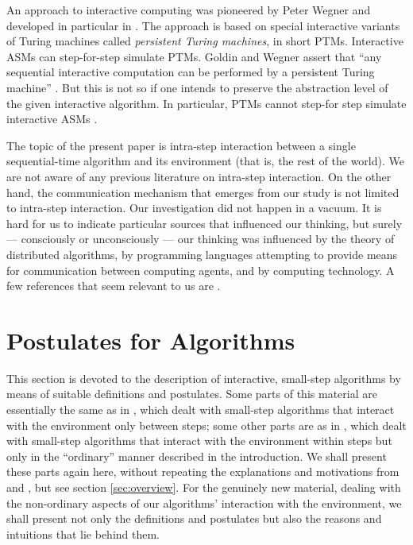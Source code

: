 \documentclass{LMCS}
\theoremstyle{definition}
\begin{document}
An approach to interactive computing was pioneered by Peter Wegner and
developed in particular in \cite{GSAS}.  The approach is based on
special interactive variants of Turing machines called \emph{persistent
Turing machines}, in short PTMs.  Interactive ASMs can step-for-step
simulate PTMs.  Goldin and Wegner assert that ``any sequential interactive
computation can be performed by a persistent Turing machine'' \cite{gsw}.
But this is not so if one intends to preserve the abstraction level of the
given interactive algorithm.  In particular, PTMs cannot step-for step
simulate interactive ASMs \cite{ia05}.

The topic of the present paper is intra-step interaction between a
single sequential-time algorithm and its environment (that is,
the rest of the world).  We are not aware of any previous literature
on intra-step interaction.  On the other hand, the communication
mechanism that emerges from our study is not limited to intra-step
interaction.  Our investigation did not happen in a vacuum.  It is
hard for us to indicate particular sources that influenced our
thinking, but surely --- consciously or unconsciously --- our thinking
was influenced by the theory of distributed algorithms, by programming
languages attempting to provide means for communication between
computing agents, and by computing technology.  A few references that
seem relevant to us are \cite{bcc,lynch, platt, rr, sw}.


\section{Postulates for Algorithms}\label{post}

This section is devoted to the description of interactive,
small-step algorithms by means of suitable definitions and
postulates.  Some parts of this material are essentially the same as
in \cite{seqth}, which dealt with small-step algorithms that
interact with the environment only between steps; some other parts
are as in \cite{oa1}, which dealt with small-step algorithms that
interact with the environment within steps but only in the
``ordinary'' manner described in the introduction.  We shall present
these parts again here, without repeating the explanations and
motivations from \cite{seqth} and \cite{oa1}, but see section
\ref{sec:overview}. For the genuinely new material, dealing with the
non-ordinary aspects of our algorithms' interaction with the
environment, we shall present not only the definitions and
postulates but also the reasons and intuitions that lie behind them.
\end{document}

